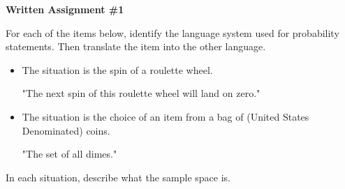 \documentclass[12pt,letterpaper]{article}
\begin{document}
\setlength{\parskip}{1ex plus 0.5ex minus 0.2ex}
\setlength{\parindent}{0pt}

\pagestyle{fancy}
\lfoot{}
\rfoot{}

\begin{center}
{
\Large
\textbf{Written Assignment \#1}
}
\end{center}

For each of the items below, identify the language system used for probability statements. Then translate the item into the other language.

\begin{itemize}
\item  The situation is the spin of a roulette wheel. 

"The next spin of this roulette wheel will land on zero."

\item The situation is the choice of an item from a bag of (United States Denominated) coins.

"The set of all dimes."
\end{itemize}

In each situation, describe what the sample space is.
\end{document}
